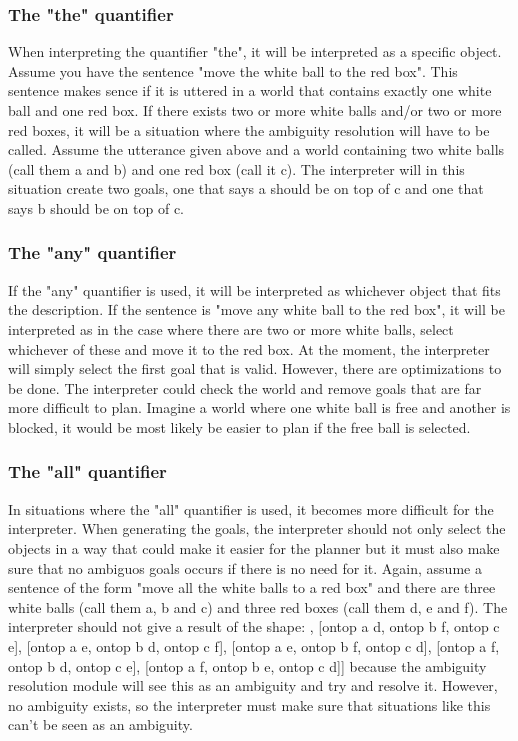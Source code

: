\documentclass[11pt]{article}
\begin{document}
\subsubsection*{The "the" quantifier}
When interpreting the quantifier "the", it will be interpreted as a specific object. Assume you have the sentence "move the white ball to the red box". This sentence makes sence if it is uttered in a world that contains exactly one white ball and one red box. If there exists two or more white balls and/or two or more red boxes, it will be a situation where the ambiguity resolution will have to be called. Assume the utterance given above and a world containing two white balls (call them a and b) and one red box (call it c). The interpreter will in this situation create two goals, one that says a should be on top of c and one that says b should be on top of c.

\subsubsection*{The "any" quantifier}
If the "any" quantifier is used, it will be interpreted as whichever object that fits the description. If the sentence is "move any white ball to the red box", it will be interpreted as in the case where there are two or more white balls, select whichever of these and move it to the red box. At the moment, the interpreter will simply select the first goal that is valid. However, there are optimizations to be done. The interpreter could check the world and remove goals that are far more difficult to plan. Imagine a world where one white ball is free and another is blocked, it would be most likely be easier to plan if the free ball is selected.

\subsubsection*{The "all" quantifier}
In situations where the "all" quantifier is used, it becomes more difficult for the interpreter. When generating the goals, the interpreter should not only select the objects in a way that could make it easier for the planner but it must also make sure that no ambiguos goals occurs if there is no need for it. Again, assume a sentence of the form "move all the white balls to a red box" and there are three white balls (call them a, b and c) and three red boxes (call them d, e and f). The interpreter should not give a result of the shape:
\newline
[[ontop a d, ontop b e, ontop c f], [ontop a d, ontop b f, ontop c e], [ontop a e, ontop b d, ontop c f], [ontop a e, ontop b f, ontop c d], [ontop a f, ontop b d, ontop c e], [ontop a f, ontop b e, ontop c d]]
\newline
because the ambiguity resolution module will see this as an ambiguity and try and resolve it. However, no ambiguity exists, so the interpreter must make sure that situations like this can't be seen as an ambiguity.
\end{document}
